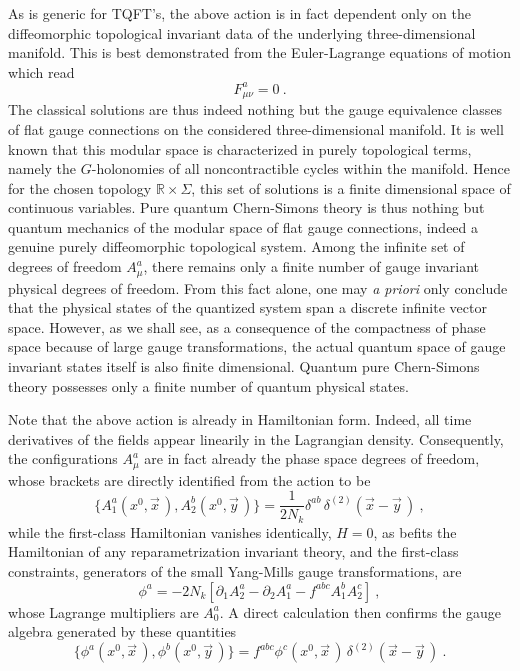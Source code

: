 \documentclass[a4paper,11pt]{article}
\def\R{\mathbb R}
\begin{document}
As is generic for TQFT's, the above action is in fact dependent
only on the diffeomorphic topological invariant data of the underlying
three-dimensional manifold. This is best demonstrated from the 
Euler-Lagrange equations of motion which read
\begin{equation}
F^a_{\mu\nu}=0\ .
\end{equation}
The classical solutions are thus indeed nothing but the gauge equivalence
classes of flat gauge connections on the considered three-dimensional 
manifold. It is well known that this modular space is characterized in purely 
topological terms, namely the $G$-holonomies of all noncontractible cycles
within the manifold. Hence for the chosen topology $\R\times\Sigma$,
this set of solutions is a finite dimensional space of continuous variables. 
Pure quantum Chern-Simons theory is thus
nothing but quantum mechanics of the modular space of flat gauge connections,
indeed a genuine purely diffeomorphic topological system.\cite{Wit2} Among the
infinite set of degrees of freedom $A^a_\mu$, there remains only a finite
number of gauge invariant physical degrees of freedom. From this fact alone,
one may {\sl a priori\/} only conclude that the physical states of the 
quantized system span a discrete infinite vector space. However, as we
shall see, as a consequence of the compactness of phase space because of
large gauge transformations, the actual quantum space of gauge invariant
states itself is also finite dimensional. Quantum pure Chern-Simons theory
possesses only a finite number of quantum physical states.

Note that the above action is already in Hamiltonian form. Indeed, all
time derivatives of the fields appear linearily in the Lagrangian density.
Consequently, the configurations $A^a_\mu$ are in fact already the
phase space degrees of freedom, whose brackets are directly identified
from the action to be
\begin{equation}
\{A^a_1(x^0,\vec{x}\,),A^b_2(x^0,\vec{y}\,)\}=
\frac{1}{2N_k}\delta^{ab}\,\delta^{(2)}(\vec{x}-\vec{y}\,)\ ,
\end{equation}
while the first-class Hamiltonian vanishes identically, $H=0$, as
befits the Hamiltonian of any reparametrization invariant theory,
and the first-class constraints, generators of the small Yang-Mills
gauge transformations, are
\begin{equation}
\phi^a=-2N_k\left[\partial_1A^a_2-\partial_2A^a_1-f^{abc}A^b_1A^c_2\right]\ ,
\end{equation}
whose Lagrange multipliers are $A^a_0$. A direct calculation then confirms
the gauge algebra generated by these quantities
\begin{equation}
\{\phi^a(x^0,\vec{x}\,),\phi^b(x^0,\vec{y}\,)\}=f^{abc}\phi^c(x^0,\vec{x}\,)\,
\delta^{(2)}\left(\vec{x}-\vec{y}\,\right)\ .
\end{equation}
\end{document}
